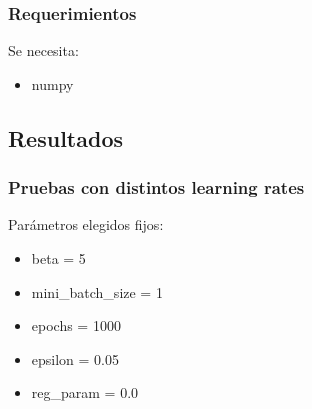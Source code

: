 
\subsubsection{Requerimientos}

Se necesita:
\begin{itemize}
\item numpy
\end{itemize}


\subsection{Resultados}


\subsubsection{Pruebas con distintos learning rates}

Parámetros elegidos fijos:

\begin{itemize}
\item beta = 5
\item mini\_batch\_size = 1
\item epochs = 1000
\item epsilon = 0.05
\item reg\_param = 0.0
\end{itemize}


